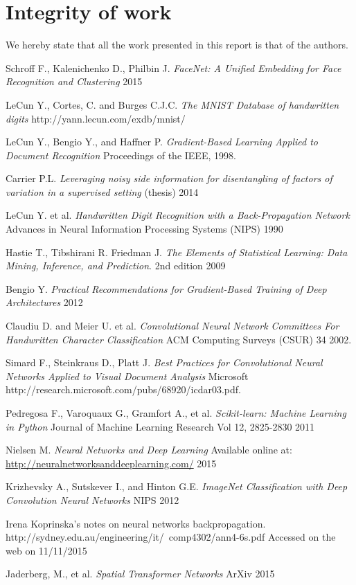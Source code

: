 \documentclass[conference]{IEEEtran}
\begin{document}
\section{Integrity of work}
We hereby state that all the work presented in this report is that of the authors.
\begin{thebibliography}{9}

Schroff F., Kalenichenko D., Philbin J.
\emph{FaceNet: A Unified Embedding for Face Recognition and Clustering}
2015

LeCun Y., Cortes, C. and Burges C.J.C.
	\emph{The MNIST Database of handwritten digits}
	http://yann.lecun.com/exdb/mnist/


LeCun Y., Bengio Y., and Haffner P.
 \emph{Gradient-Based Learning Applied to Document Recognition}
 Proceedings of the IEEE,
 1998.

Carrier P.L.
\emph{Leveraging noisy side information for disentangling of factors of
variation in a supervised setting} (thesis)
2014


  LeCun Y. et al.
  \emph{Handwritten Digit Recognition with a Back-Propagation Network}
    Advances in Neural Information Processing Systems (NIPS)
    1990

 Hastie T., Tibshirani R. Friedman J.
 \emph{The Elements of Statistical Learning: Data Mining, Inference, and Prediction}.
2nd edition
2009

Bengio Y.
\emph{Practical Recommendations for Gradient-Based Training of Deep Architectures}
2012

 Claudiu D. and Meier U. et al.
  \emph{Convolutional Neural Network Committees For Handwritten Character
Classification}
  ACM Computing Surveys (CSUR) 34
  2002.

  
  Simard F., Steinkraus D., Platt J.
  \emph{Best Practices for Convolutional Neural Networks
Applied to Visual Document Analysis}
	Microsoft
    http://research.microsoft.com/pubs/68920/icdar03.pdf.


Pedregosa F., Varoquaux G., Gramfort A., et al.
\emph{Scikit-learn: Machine Learning in {P}ython}
Journal of Machine Learning Research    
Vol 12, 2825-2830 2011   

Nielsen M.
\emph{Neural Networks and Deep Learning}
Available online at: \href{http://neuralnetworksanddeeplearning.com/}{http://neuralnetworksanddeeplearning.com/}
2015       

Krizhevsky A., Sutskever I., and Hinton G.E.
\emph{ImageNet Classification with Deep Convolution Neural Networks}
	NIPS 2012

	Irena Koprinska's notes on neural networks backpropagation.
	http://sydney.edu.au/engineering/it/~comp4302/ann4-6s.pdf
	Accessed on the web on 11/11/2015

 Jaderberg, M., et al.
  \emph{Spatial Transformer Networks}
  ArXiv
  2015

\end{thebibliography}
\end{document}
